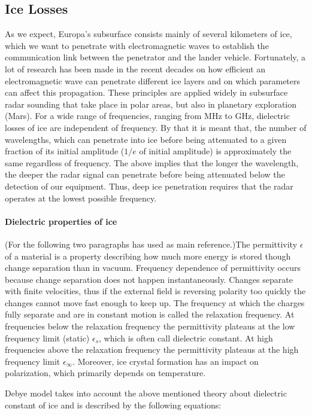 \subsection{Ice Losses}
As we expect, Europa's subsurface consists mainly of several kilometers of ice, which we want to penetrate with electromagnetic waves to establish the communication link between the penetrator and the lander vehicle. Fortunately, a lot of research has been made in the recent decades on how efficient an electromagnetic wave can penetrate different ice layers and on which parameters can affect this propagation. These principles are applied widely in subsurface radar sounding that take place in polar areas, but also in planetary exploration (Mars). For a wide range of frequencies, ranging from MHz to GHz, dielectric losses of ice are independent of frequency. By that it is meant that, the number of wavelengths, which can penetrate into ice before being attenuated to a given fraction of its initial amplitude ($1/e$ of initial amplitude) is approximately the same regardless of frequency. The above implies that the longer the wavelength, the deeper the radar signal can penetrate before being attenuated below the detection of our equipment. Thus, deep ice penetration requires that the radar operates at the lowest possible frequency. 

\paragraph{Dielectric properties of ice}
(For the following two paragraphs \cite{Kofman_2010} has used as main reference.)The permittivity $\epsilon$ of a material is a property describing how much more energy is stored though change separation than in vacuum. Frequency dependence of permittivity occurs because change separation does not happen instantaneously. Changes separate with finite velocities, thus if the external field is reversing polarity too quickly the changes cannot move fast enough to keep up. The frequency at which the charges fully separate and are in constant motion is called the relaxation frequency. At frequencies below the relaxation frequency the permittivity plateaus at the low frequency limit (static) $\epsilon_{s}$, which is often call dielectric constant. At high frequencies above the relaxation frequency the permittivity plateaus at the high frequency limit $\epsilon_{\infty}$. Moreover, ice crystal formation has an impact on polarization, which primarily depends on temperature.

Debye model takes into account the above mentioned theory about dielectric constant of ice and is described by the following equations: 

